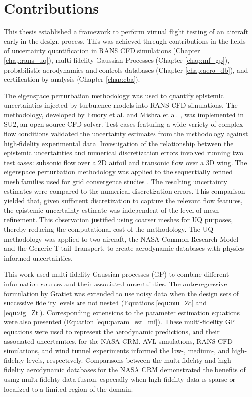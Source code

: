 \section{Contributions} \label{conclusion_contributions}

This thesis established a framework to perform virtual flight testing of an aircraft early in the design process.
This was achieved through contributions in the fields of uncertainty quantification in RANS CFD simulations (Chapter \ref{chap:rans_uq}), multi-fidelity Gaussian Processes (Chapter \ref{chap:mf_gp}), probabilistic aerodynamics and controls databases (Chapter \ref{chap:aero_db}), and certification by analysis (Chapter \ref{chap:cba}).

The eigenspace perturbation methodology was used to quantify epistemic uncertainties injected by turbulence models into RANS CFD simulations.
The methodology, developed by Emory et al. \cite{emory2013modeling} and Mishra et al. \cite{iaccarino_eig_pert}, was implemented in SU2, an open-source CFD solver. 
Test cases featuring a wide variety of complex flow conditions validated the uncertainty estimates from the methodology against high-fidelity experimental data. 
Investigation of the relationship between the epistemic uncertainties and numerical discretization errors involved running two test cases: subsonic flow over a 2D airfoil and transonic flow over a 3D wing.
The eigenspace perturbation methodology was applied to the sequentially refined mesh families used for grid convergence studies \cite{american_society_of_mechanical_engineers_standard_2009}.
The resulting uncertainty estimates were compared to the numerical discretization errors.
This comparison yielded that, given sufficient discretization to capture the relevant flow features, the epistemic uncertainty estimate was independent of the level of mesh refinement.
This observation justified using coarser meshes for UQ purposes, thereby reducing the computational cost of the methodology.   
The UQ methodology was applied to two aircraft, the NASA Common Research Model and the Generic T-tail Transport, to create aerodynamic databases with physics-informed uncertainties. 

This work used multi-fidelity Gaussian processes (GP) to combine different information sources and their associated uncertainties.
The auto-regressive formulation by Gratiet \cite{gratiet_multi-fidelity_nodate} was extended to use noisy data when the design sets of successive fidelity levels are not nested (Equations \ref{equ:mu_Zt} and \ref{equ:sig_Zt}).
Corresponding extensions to the parameter estimation equations were also presented (Equation \ref{equ:param_est_mf}).
These multi-fidelity GP equations were used to represent the aerodynamic predictions, and their associated uncertainties, for the NASA CRM.
AVL simulations, RANS CFD simulations, and wind tunnel experiments informed the low-, medium-, and high-fidelity levels, respectively.
Comparisons between the multi-fidelity and high-fidelity aerodynamic databases for the NASA CRM demonstrated the benefits of using multi-fidelity data fusion, especially when high-fidelity data is sparse or localized to a limited region of the domain. 

